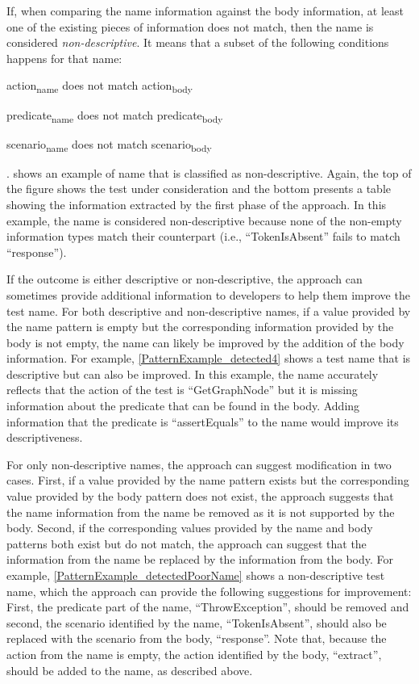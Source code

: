 If, when comparing the name information against the body information, at least one of the existing pieces of information does not match, then the name is considered \emph{non-descriptive}.
%
It means that a subset of the following conditions happens for that name:
\begin{enumerate*}[itemjoin*={{, or }}]
    \item action\textsubscript{name} does not match action\textsubscript{body}
    \item predicate\textsubscript{name} does not match predicate\textsubscript{body}
    \item scenario\textsubscript{name} does not match scenario\textsubscript{body}
\end{enumerate*}.
%
 shows an example of name that is classified as non-descriptive.
%
Again, the top of the figure shows the test under consideration and the bottom presents a table showing the information extracted by the first phase of the approach.
%
In this example, the name is considered non-descriptive because none of the non-empty information types match their counterpart (i.e., \enquote{TokenIsAbsent} fails to match \enquote{response}).


If the outcome is either descriptive or non-descriptive, the approach can sometimes provide additional information to developers to help them improve the test name.
%
For both descriptive and non-descriptive names, if a value provided by the name pattern is empty but the corresponding information provided by the body is not empty, the name can likely be improved by the addition of the body information.
%
For example, \cref{PatternExample_detected4} shows a test name that is descriptive but can also be improved.
%
In this example, the name accurately reflects that the action of the test is \enquote{GetGraphNode} but it is missing information about the predicate that can be found in the body.
%
Adding information that the predicate is \enquote{assertEquals} to the name would improve its descriptiveness.


For only non-descriptive names, the approach can suggest modification in two cases.
%
First, if a value provided by the name pattern exists but the corresponding value provided by the body pattern does not exist, the approach suggests that the name information from the name be removed as it is not supported by the body.
%
Second, if the corresponding values provided by the name and body patterns both exist but do not match, the approach can suggest that the information from the name be replaced by the information from the body.
%
For example, \cref{PatternExample_detectedPoorName} shows a non-descriptive test name, which the approach can provide the following suggestions for improvement:
%
First, the predicate part of the name, \enquote{ThrowException}, should be removed and second, the scenario identified by the name, \enquote{TokenIsAbsent}, should also be replaced with the scenario from the body, \enquote{response}.
%
Note that, because the action from the name is empty, the action identified by the body, \enquote{extract}, should be added to the name, as described above.


